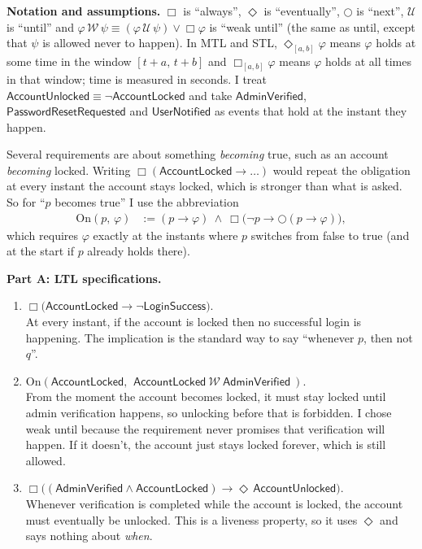 \documentclass[a4paper, 11pt]{article}
\newcommand{\ap}[1]{\mathsf{#1}}
\newcommand{\LS}{\ap{LoginSuccess}}
\newcommand{\AL}{\ap{AccountLocked}}
\newcommand{\AU}{\ap{AccountUnlocked}}
\newcommand{\AV}{\ap{AdminVerified}}
\newcommand{\PR}{\ap{PasswordResetRequested}}
\newcommand{\UN}{\ap{UserNotified}}
\newcommand{\G}{\Box}
\newcommand{\F}{\Diamond}
\newcommand{\X}{\bigcirc}
\newcommand{\On}[2]{\mathrm{On}(#1,\,#2)}
\begin{document}
\begin{solution}
\noindent\textbf{Notation and assumptions.}
$\G$ is ``always'', $\F$ is ``eventually'', $\X$ is ``next'', $\mathcal{U}$ is ``until'' and $\varphi\,\mathcal{W}\,\psi \equiv (\varphi\,\mathcal{U}\,\psi)\vee\G\varphi$ is ``weak until'' (the same as until, except that $\psi$ is allowed never to happen). In MTL and STL, $\F_{[a,b]}\varphi$ means $\varphi$ holds at some time in the window $[t+a,\,t+b]$ and $\G_{[a,b]}\varphi$ means $\varphi$ holds at all times in that window; time is measured in seconds. I treat $\AU\equiv\neg\AL$ and take $\AV$, $\PR$ and $\UN$ as events that hold at the instant they happen.

Several requirements are about something \emph{becoming} true, such as an account \emph{becoming} locked. Writing $\G(\AL\to\dots)$ would repeat the obligation at every instant the account stays locked, which is stronger than what is asked. So for ``$p$ becomes true'' I use the abbreviation
\begin{align*}
    \On{p}{\varphi} &:= (p\to\varphi)\ \wedge\ \G\big(\neg p\to\X(p\to\varphi)\big),
\end{align*}
which requires $\varphi$ exactly at the instants where $p$ switches from false to true (and at the start if $p$ already holds there).

\bigskip
\noindent\textbf{Part A: LTL specifications.}
\begin{enumerate}
    \item $\G\big(\AL \to \neg\LS\big)$. \\
    At every instant, if the account is locked then no successful login is happening. The implication is the standard way to say ``whenever $p$, then not $q$''.

    \item $\On{\AL}{\ \AL\ \mathcal{W}\ \AV\ }$. \\
    From the moment the account becomes locked, it must stay locked until admin verification happens, so unlocking before that is forbidden. I chose weak until because the requirement never promises that verification will happen. If it doesn't, the account just stays locked forever, which is still allowed.

    \item $\G\big((\AV \wedge \AL) \to \F\,\AU\big)$. \\
    Whenever verification is completed while the account is locked, the account must eventually be unlocked. This is a liveness property, so it uses $\F$ and says nothing about \emph{when}.


\end{enumerate}
\end{solution}
\end{document}

